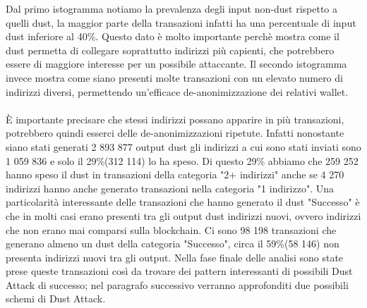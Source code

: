 \FloatBarrier
Dal primo istogramma notiamo la prevalenza degli input non-dust rispetto a quelli dust, la maggior parte della transazioni infatti ha una percentuale di input dust inferiore al 40\%. Questo dato è molto importante perchè mostra come il dust permetta di collegare soprattutto indirizzi più capienti, che potrebbero essere di maggiore interesse per un possibile attaccante. Il secondo istogramma invece mostra come siano presenti molte transazioni con un elevato numero di indirizzi diversi, permettendo un'efficace de-anonimizzazione dei relativi wallet.\\\\
È importante precisare che stessi indirizzi possano apparire in più transazioni, potrebbero quindi esserci delle de-anonimizzazioni ripetute. Infatti nonostante siano stati generati 2 893 877 output dust gli indirizzi a cui sono stati inviati sono 1 059 836 e solo il 29\%(312 114) lo ha speso. Di questo 29\% abbiamo che 259 252 hanno speso il dust in transazioni della categoria "2+ indirizzi" anche se 4 270 indirizzi hanno anche generato transazioni nella categoria "1 indirizzo". Una particolarità interessante delle transazioni che hanno generato il dust "Successo" è che in molti casi erano presenti tra gli output dust indirizzi nuovi, ovvero indirizzi che non erano mai comparsi sulla blockchain. Ci sono 98 198 transazioni che generano almeno un dust della categoria "Successo", circa il 59\%(58 146) non presenta indirizzi nuovi tra gli output. Nella fase finale delle analisi sono state prese queste transazioni così da trovare dei pattern interessanti di possibili Dust Attack di successo; nel paragrafo successivo verranno approfonditi due possibili schemi di Dust Attack.  
